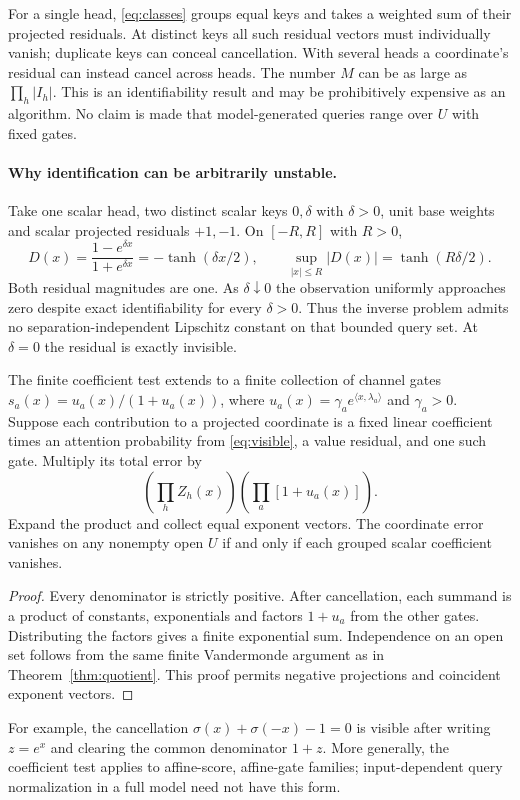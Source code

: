 For a single head, \eqref{eq:classes} groups equal keys and takes a weighted sum of their projected residuals. At distinct keys all such residual vectors must individually vanish; duplicate keys can conceal cancellation. With several heads a coordinate's residual can instead cancel across heads. The number $M$ can be as large as $\prod_h |I_h|$. This is an identifiability result and may be prohibitively expensive as an algorithm. No claim is made that model-generated queries range over $U$ with fixed gates.

\paragraph{Why identification can be arbitrarily unstable.}
Take one scalar head, two distinct scalar keys $0,\delta$ with $\delta>0$, unit base weights and scalar projected residuals $+1,-1$. On $[-R,R]$ with $R>0$,
\begin{equation}
 D(x)=\frac{1-e^{\delta x}}{1+e^{\delta x}}=-\tanh(\delta x/2),
 \qquad \sup_{|x|\le R}|D(x)|=\tanh(R\delta/2).
 \label{eq:near}
\end{equation}
Both residual magnitudes are one. As $\delta\downarrow0$ the observation uniformly approaches zero despite exact identifiability for every $\delta>0$. Thus the inverse problem admits no separation-independent Lipschitz constant on that bounded query set. At $\delta=0$ the residual is exactly invisible.

\begin{corollary}\label{cor:gates}
The finite coefficient test extends to a finite collection of channel gates
$s_a(x)=u_a(x)/(1+u_a(x))$, where $u_a(x)=\gamma_a e^{\langle x,\lambda_a\rangle}$ and $\gamma_a>0$. Suppose each contribution to a projected coordinate is a fixed linear coefficient times an attention probability from \eqref{eq:visible}, a value residual, and one such gate. Multiply its total error by
\begin{equation}
  \left(\prod_h Z_h(x)\right)\left(\prod_a[1+u_a(x)]\right).
\end{equation}
Expand the product and collect equal exponent vectors. The coordinate error vanishes on any nonempty open $U$ if and only if each grouped scalar coefficient vanishes.
\end{corollary}
\begin{proof}
Every denominator is strictly positive. After cancellation, each summand is a product of constants, exponentials and factors $1+u_a$ from the other gates. Distributing the factors gives a finite exponential sum. Independence on an open set follows from the same finite Vandermonde argument as in Theorem~\ref{thm:quotient}. This proof permits negative projections and coincident exponent vectors.
\end{proof}
For example, the cancellation $\sigma(x)+\sigma(-x)-1=0$ is visible after writing $z=e^x$ and clearing the common denominator $1+z$. More generally, the coefficient test applies to affine-score, affine-gate families; input-dependent query normalization in a full model need not have this form.


